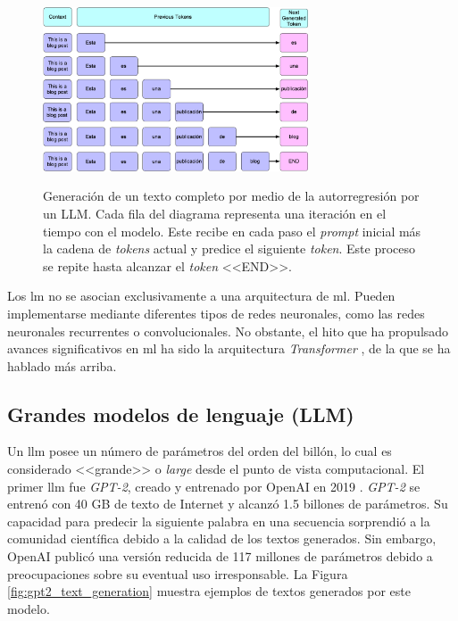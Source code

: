 \begin{figure}[H]
    \caption[Generación de un texto completo por medio de la autorregresión por un LLM]{Generación de un texto completo por medio de la autorregresión por un LLM. Cada fila del diagrama representa una iteración en el tiempo con el modelo. Este recibe en cada paso el \emph{prompt} inicial más la cadena de \emph{tokens} actual y predice el siguiente \emph{token}. Este proceso se repite hasta alcanzar el \emph{token} <<END>>.}
    \centering
    \includegraphics[width=0.7\textwidth]{./figuras/text-gen-diagram-autoregressive.png}
    \label{fig:llm_generation_example}
\end{figure}

Los \gls{lm} no se asocian exclusivamente a una arquitectura de \gls{ml}. Pueden implementarse mediante diferentes tipos de redes neuronales, como las redes neuronales recurrentes o convolucionales. No obstante, el hito que ha propulsado avances significativos en \gls{ml} ha sido la arquitectura \textit{Transformer} \citep{vaswaniAttentionAllYou2017}, de la que se ha hablado más arriba.

\subsection{Grandes modelos de lenguaje (LLM)}

Un \gls{llm} posee un número de parámetros del orden del billón, lo cual es considerado <<grande>> o \textit{large} desde el punto de vista computacional. El primer \gls{llm} fue \textit{GPT-2}, creado y entrenado por OpenAI en 2019 \citep{radfordLanguageModelsAre2019}. \textit{GPT-2} se entrenó con 40 GB de texto de Internet y alcanzó 1.5 billones de parámetros. Su capacidad para predecir la siguiente palabra en una secuencia sorprendió a la comunidad científica debido a la calidad de los textos generados. Sin embargo, OpenAI publicó una versión reducida de 117 millones de parámetros debido a preocupaciones sobre su eventual uso irresponsable. La Figura \ref{fig:gpt2_text_generation} muestra ejemplos de textos generados por este modelo.

